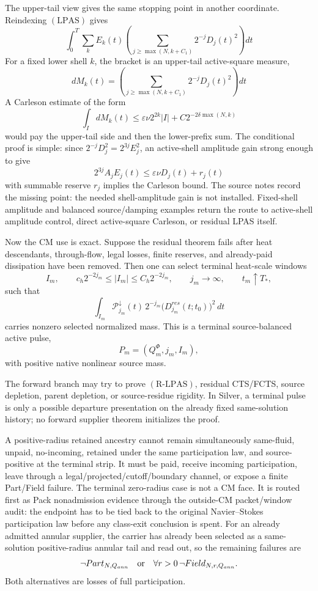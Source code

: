 The upper-tail view gives the same stopping point in another coordinate.
Reindexing \((\mathrm{LPAS})\) gives
\[
  \int_0^T
  \sum_k E_k(t)
  \left(
  \sum_{j\ge \max(N,k+C_1)}
  2^{-j}D_j(t)^2
  \right)dt
\]
For a fixed lower shell \(k\), the bracket is an upper-tail active-square
measure,
\[
  dM_k(t)
  =
  \left(
  \sum_{j\ge \max(N,k+C_1)}
  2^{-j}D_j(t)^2
  \right)dt
\]
A Carleson estimate of the form
\[
  \int_I dM_k(t)
  \le
  \varepsilon\nu2^{2k}|I|
  +C2^{-2\delta\max(N,k)}
\]
would pay the upper-tail side and then the lower-prefix sum.  The conditional
proof is simple: since \(2^{-j}D_j^2=2^{3j}E_j^2\), an active-shell amplitude
gain strong enough to give
\[
  2^{3j}A_jE_j(t)
  \le
  \varepsilon\nu D_j(t)+r_j(t)
\]
with summable reserve \(r_j\) implies the Carleson bound.  The source
notes record the missing point: the needed shell-amplitude gain is not
installed.  Fixed-shell amplitude and balanced source/damping examples return
the route to active-shell amplitude control, direct active-square Carleson, or
residual LPAS itself.

Now the CM use is exact.  Suppose the residual theorem fails after heat
descendants, through-flow, legal losses, finite reserves, and already-paid
dissipation have been removed.  Then one can select terminal heat-scale
windows
\[
  I_m,
  \qquad
  c_h2^{-2j_m}\le |I_m|\le C_h2^{-2j_m},
  \qquad
  j_m\to\infty,
  \qquad
  t_m\uparrow T_*,
\]
such that
\[
  \int_{I_m}
  \mathcal P_{j_m}^\downarrow(t)\,
  2^{-j_m}
  \bigl(D_{j_m}^{res}(t;t_0)\bigr)^2\,dt
\]
carries nonzero selected normalized mass.  This is a terminal
source-balanced active pulse,
\[
  P_m=(Q_m^\Phi,j_m,I_m),
\]
with positive native nonlinear source mass.

The forward branch may try to prove \((\mathrm{R\text{-}LPAS})\), residual
CTS/FCTS, source depletion, parent depletion, or source-residue rigidity.  In
Silver, a terminal pulse is only a possible departure presentation on the
already fixed same-solution history; no forward supplier theorem initializes
the proof.

A positive-radius retained ancestry cannot remain simultaneously same-fluid,
unpaid, no-incoming, retained under the same participation law, and
source-positive at the terminal strip.  It must be paid, receive incoming
participation, leave through a legal/projected/cutoff/boundary channel, or
expose a finite Part/Field failure.  The terminal zero-radius case is not a
CM face.  It is routed first as Pack nonadmission evidence through the outside-CM packet/window audit:
the endpoint has to be tied back to the original Navier--Stokes participation
law before any class-exit conclusion is spent.
For an already admitted annular supplier, the carrier has already been selected
as a same-solution positive-radius annular tail and read out, so the remaining
failures are
\[
  \neg Part_{N,Q_{ann}}
  \quad\hbox{or}\quad
  \forall r>0\,\neg Field_{N,r,Q_{ann}}.
\]
Both alternatives are losses of full participation.

